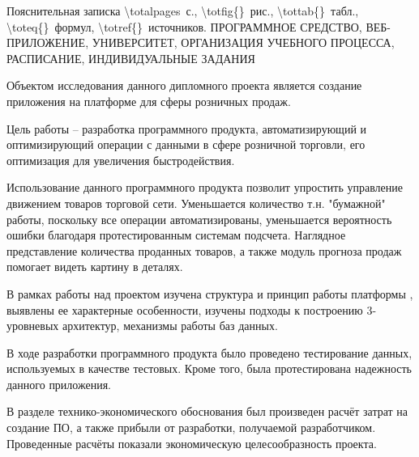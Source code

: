 \setcounter{page}{2}


\begin{center}
	Пояснительная записка \num{\totalpages}~с., \num{\totfig{}}~рис., \num{\tottab{}}~табл., \num{\toteq{}}~формул, \num{\totref{}}~источников.
	\MakeUppercase{Программное средство, веб-приложение, университет, организация учебного процесса, расписание, индивидуальные задания}
\end{center}

Объектом исследования данного дипломного проекта является создание приложения на платформе \LB для сферы розничных продаж.

Цель работы – разработка программного продукта, автоматизирующий и оптимизирующий операции с данными в сфере розничной торговли, его оптимизация для увеличения быстродействия.

Использование данного программного продукта позволит упростить управление движением товаров торговой сети. Уменьшается количество т.н. "бумажной" работы, поскольку все операции автоматизированы, уменьшается вероятность ошибки благодаря протестированным системам подсчета. Наглядное представление количества проданных товаров, а также модуль прогноза продаж помогает видеть картину в деталях.

В рамках работы над проектом изучена структура и принцип работы платформы \LB, выявлены ее характерные особенности, изучены подходы к построению 3-уровневых архитектур, механизмы работы баз данных.

В ходе разработки программного продукта было проведено тестирование данных, используемых в качестве тестовых. Кроме того, была протестирована надежность данного приложения.

В разделе технико-экономического обоснования был произведен расчёт затрат на создание ПО, а также прибыли от разработки, получаемой разработчиком. Проведенные расчёты показали экономическую целесообразность проекта.
